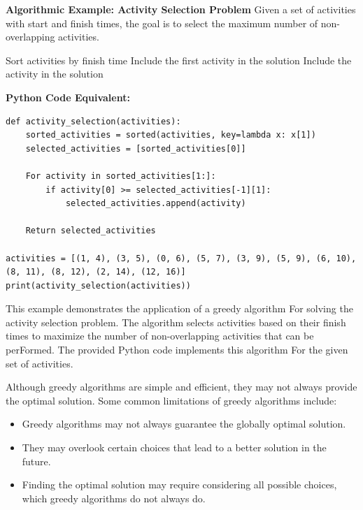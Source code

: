 \documentclass[12pt]{book} %
\begin{document}
\textbf{Algorithmic Example: Activity Selection Problem}
\FloatBarrier
Given a set of activities with start and finish times, the goal is to select the maximum number of non-overlapping activities.
\FloatBarrier
\begin{algorithm}
\caption{Activity Selection Problem}
\begin{algorithmic}[1]
\State Sort activities by finish time
\State Include the first activity in the solution
        \State Include the activity in the solution
    \EndIf
\EndFor
\end{algorithmic}
\end{algorithm}
\FloatBarrier
\textbf{Python Code Equivalent:}
\begin{lstlisting}
def activity_selection(activities):
    sorted_activities = sorted(activities, key=lambda x: x[1])
    selected_activities = [sorted_activities[0]]
    
    For activity in sorted_activities[1:]:
        if activity[0] >= selected_activities[-1][1]:
            selected_activities.append(activity)
    
    Return selected_activities

activities = [(1, 4), (3, 5), (0, 6), (5, 7), (3, 9), (5, 9), (6, 10), (8, 11), (8, 12), (2, 14), (12, 16)]
print(activity_selection(activities)) 
\end{lstlisting}
\FloatBarrier
This example demonstrates the application of a greedy algorithm For solving the activity selection problem. The algorithm selects activities based on their finish times to maximize the number of non-overlapping activities that can be perFormed. The provided Python code implements this algorithm For the given set of activities.


Although greedy algorithms are simple and efficient, they may not always provide the optimal solution. Some common limitations of greedy algorithms include:
\begin{itemize}
    \item Greedy algorithms may not always guarantee the globally optimal solution.
    \item They may overlook certain choices that lead to a better solution in the future.
    \item Finding the optimal solution may require considering all possible choices, which greedy algorithms do not always do.
\end{itemize}
\end{document}
